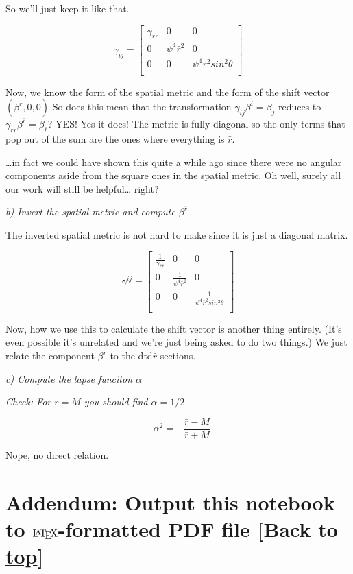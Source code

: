 \documentclass[landscape,letterpaper,10pt,english]{article}
\let\Oldlatex\LaTeX
\renewcommand{\LaTeX}{\textrm{\Oldlatex}}
\begin{document}
So we'll just keep it like that.

\[
\gamma_{ij} = \begin{bmatrix}
\gamma_{\bar r \bar r} & 0 & 0 \\
0 & \psi^4 \bar r^2 & 0 \\
0 & 0 & \psi^4 \bar r^2 sin^2\theta \\
\end{bmatrix}
\]

    Now, we know the form of the spatial metric and the form of the shift
vector \((\beta^\bar{r} , 0 , 0)\) So does this mean that the
transformation \(\gamma_{ij}\beta^i = \beta_j\) reduces to
\(\gamma_{\bar{r}\bar{r}}\beta^\bar{r} = \beta_\bar{r}\)? YES! Yes it
does! The metric is fully diagonal so the only terms that pop out of the
sum are the ones where everything is \(\bar r\).

\ldots in fact we could have shown this quite a while ago since there
were no angular components aside from the square ones in the spatial
metric. Oh well, surely all our work will still be helpful\ldots{}
right?

    \emph{b) Invert the spatial metric and compute \(\beta^{\bar r}\)}

    The inverted spatial metric is not hard to make since it is just a
diagonal matrix.

\[
\gamma^{ij} = \begin{bmatrix}
\frac{1}{\gamma_{\bar r \bar r}} & 0 & 0 \\
0 & \frac{1}{\psi^4 \bar r^2 }& 0 \\
0 & 0 & \frac{1}{\psi^4 \bar r^2 sin^2\theta} \\
\end{bmatrix}
\]

Now, how we use this to calculate the shift vector is another thing
entirely. (It's even possible it's unrelated and we're just being asked
to do two things.) We just relate the component \(\beta^\bar{r}\) to the
dtd\(\bar{r}\) sections.

    \emph{c) Compute the lapse funciton \(\alpha\)}

\emph{Check: For \(\bar r = M\) you should find \(\alpha = 1/2\)}

\[ -\alpha^2 = -\frac{\bar{r} - M}{\bar{r} + M} \]

Nope, no direct relation.

    \hypertarget{addendum-output-this-notebook-to-latex-formatted-pdf-file-back-to-top}{%
\section{\texorpdfstring{Addendum: Output this notebook to
\(\LaTeX\)-formatted PDF file {[}Back to
\hyperref[toc]{top}{]}}{Addendum: Output this notebook to \textbackslash LaTeX-formatted PDF file {[}Back to {]}}}\label{addendum-output-this-notebook-to-latex-formatted-pdf-file-back-to-top}}
\end{document}
